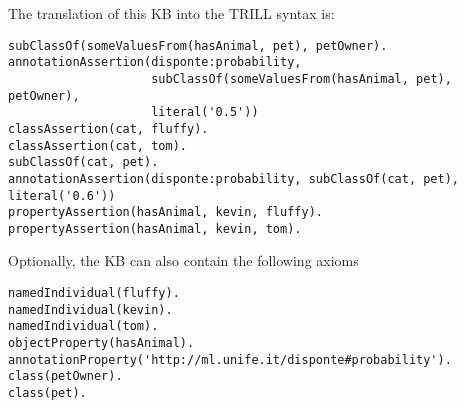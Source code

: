 The translation of this KB into the TRILL syntax is:
\begin{verbatim}
subClassOf(someValuesFrom(hasAnimal, pet), petOwner).
annotationAssertion(disponte:probability,
                    subClassOf(someValuesFrom(hasAnimal, pet), petOwner),
                    literal('0.5'))
classAssertion(cat, fluffy).
classAssertion(cat, tom).
subClassOf(cat, pet).
annotationAssertion(disponte:probability, subClassOf(cat, pet), literal('0.6'))
propertyAssertion(hasAnimal, kevin, fluffy).
propertyAssertion(hasAnimal, kevin, tom).
\end{verbatim}
Optionally, the KB can also contain the following axioms
\begin{verbatim}
namedIndividual(fluffy).
namedIndividual(kevin).
namedIndividual(tom).
objectProperty(hasAnimal).
annotationProperty('http://ml.unife.it/disponte#probability').
class(petOwner).
class(pet).
\end{verbatim}


